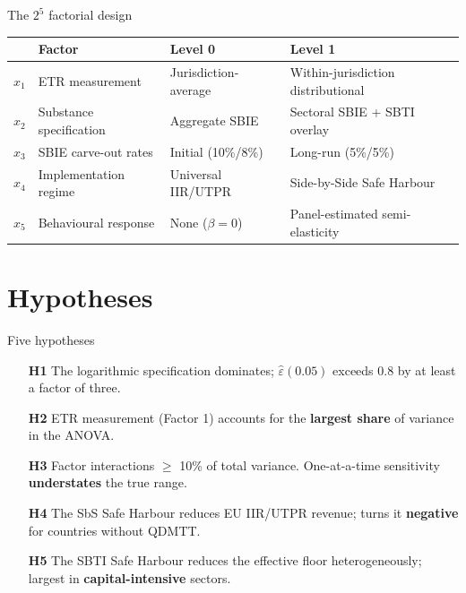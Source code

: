 \documentclass[aspectratio=169, 11pt]{beamer}
\newcommand{\highlight}[1]{\textcolor{DkOrange}{\textbf{#1}}}
\newcommand{\emphbx}[1]{\textcolor{Bordeaux}{\textbf{#1}}}
\begin{document}
\begin{frame}{The $2^5$ factorial design}
\begin{center}
\footnotesize
\begin{tabular}{@{}L{0.7cm}L{3.8cm}L{3.5cm}L{3.8cm}@{}}
  \toprule
  & \textbf{Factor} & \textbf{Level 0} & \textbf{Level 1} \\
  \midrule
  $x_1$ & ETR measurement & Jurisdiction-average & Within-jurisdiction distributional \\[2pt]
  $x_2$ & Substance specification & Aggregate SBIE & Sectoral SBIE + SBTI overlay \\[2pt]
  $x_3$ & SBIE carve-out rates & Initial (10\%/8\%) & Long-run (5\%/5\%) \\[2pt]
  $x_4$ & Implementation regime & Universal IIR/UTPR & Side-by-Side Safe Harbour \\[2pt]
  $x_5$ & Behavioural response & None ($\beta = 0$) & Panel-estimated semi-elasticity \\
  \bottomrule
\end{tabular}
\end{center}
\end{frame}

\section{Hypotheses}

\begin{frame}{Five hypotheses}
\begin{enumerate}
  \item[\textbf{H1}] The logarithmic specification dominates; $\hat{\varepsilon}(0.05)$ exceeds 0.8 by at least a factor of three.

  \item[\textbf{H2}] ETR measurement (Factor 1) accounts for the \highlight{largest share} of variance in the ANOVA.

  \item[\textbf{H3}] Factor interactions $\geq$ 10\% of total variance. One-at-a-time sensitivity \emphbx{understates} the true range.

  \item[\textbf{H4}] The SbS Safe Harbour reduces EU IIR/UTPR revenue; turns it \emphbx{negative} for countries without QDMTT.

  \item[\textbf{H5}] The SBTI Safe Harbour reduces the effective floor heterogeneously; largest in \highlight{capital-intensive} sectors.
\end{enumerate}
\end{frame}
\end{document}
